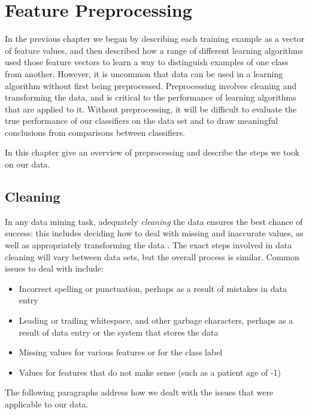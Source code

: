 \chapter{Feature Preprocessing} \label{chap:preprocess}

In the previous chapter we began by describing each training example as a
vector of feature values, and then described how a range of different
learning algorithms used those feature vectors to learn a way to
distinguish examples of one class from another. However, it is uncommon that
data can be used in a learning algorithm without first being preprocessed.
Preprocessing involves cleaning and transforming the data, and is critical
to the performance of learning algorithms that are applied to it. Without
preprocessing, it will be difficult to evaluate the true performance of
our classifiers on the data set and to draw meaningful conclusions from
comparisons between classifiers.

In this chapter give an overview of preprocessing and describe the steps we
took on our data.

\section{Cleaning} %
In any data mining task, adequately \textit{cleaning} the data ensures the best
chance of success: this includes deciding how to deal with missing and
inaccurate values, as well as appropriately transforming the data
\citep{Witten2005}.
The exact steps involved in data cleaning will vary between data
sets, but the overall process is similar. Common issues to deal with include:
\begin{itemize}
\item Incorrect spelling or punctuation, perhaps as a result of mistakes in
data entry
\item Leading or trailing whitespace, and other garbage characters,
perhaps as a result of data entry or
the system that stores the data
\item Missing values for various features or for the class label
\item Values for features that do not make sense (such as a patient age of
-1)
\end{itemize}
The following paragraphs address how we dealt with the issues that were
applicable to our data.

